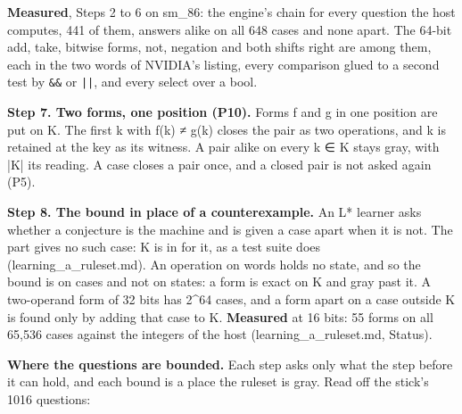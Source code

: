 \textbf{Measured}, Steps 2 to 6 on sm\_\allowbreak{}86: the engine's chain for every question the host computes, 441 of them, answers alike on all 648 cases and none apart. The 64-bit add, take, bitwise forms, not, negation and both shifts right are among them, each in the two words of NVIDIA's listing, every comparison glued to a second test by \texttt{\&\&} or \texttt{||}, and every select over a bool.

\textbf{Step 7. Two forms, one position (P10).} Forms f and g in one position are put on K. The first k with f(k) ≠ g(k) closes the pair as two operations, and k is retained at the key as its witness. A pair alike on every k ∈ K stays gray, with |K| its reading. A case closes a pair once, and a closed pair is not asked again (P5).

\textbf{Step 8. The bound in place of a counterexample.} An L* learner asks whether a conjecture is the machine and is given a case apart when it is not. The part gives no such case: K is in for it, as a test suite does (learning\_\allowbreak{}a\_\allowbreak{}ruleset.md). An operation on words holds no state, and so the bound is on cases and not on states: a form is exact on K and gray past it. A two-operand form of 32 bits has 2\textasciicircum{}64 cases, and a form apart on a case outside K is found only by adding that case to K. \textbf{Measured} at 16 bits: 55 forms on all 65,536 cases against the integers of the host (learning\_\allowbreak{}a\_\allowbreak{}ruleset.md, Status).

\textbf{Where the questions are bounded.} Each step asks only what the step before it can hold, and each bound is a place the ruleset is gray. Read off the stick's 1016 questions:

